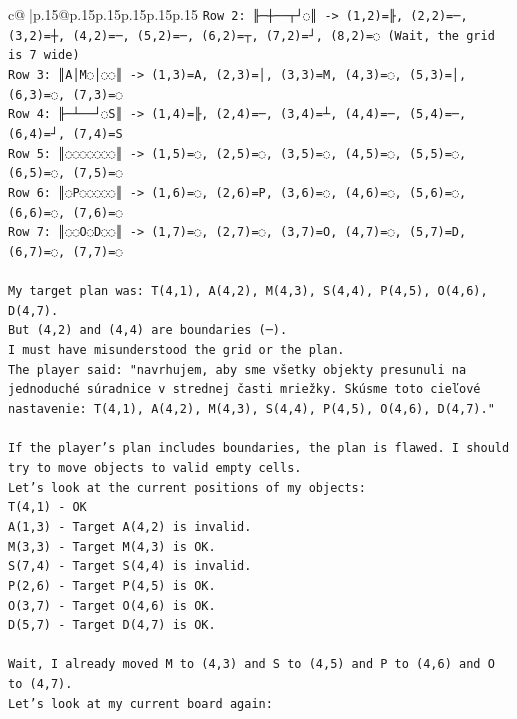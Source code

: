 \documentclass{article}
\begin{document}
{\begin{supertabular}{c@{$\;$}|p{.15\linewidth}@{}p{.15\linewidth}p{.15\linewidth}p{.15\linewidth}p{.15\linewidth}p{.15\linewidth}}
{{{\texttt{Row 2: ╟─┼──┬┘◌║ {-}> (1,2)=╟, (2,2)=─, (3,2)=┼, (4,2)=─, (5,2)=─, (6,2)=┬, (7,2)=┘, (8,2)=◌ (Wait, the grid is 7 wide)} \\
\texttt{Row 3: ║A│M◌│◌◌║ {-}> (1,3)=A, (2,3)=│, (3,3)=M, (4,3)=◌, (5,3)=│, (6,3)=◌, (7,3)=◌} \\
\texttt{Row 4: ╟─┴──┘◌S║ {-}> (1,4)=╟, (2,4)=─, (3,4)=┴, (4,4)=─, (5,4)=─, (6,4)=┘, (7,4)=S} \\
\texttt{Row 5: ║◌◌◌◌◌◌◌║ {-}> (1,5)=◌, (2,5)=◌, (3,5)=◌, (4,5)=◌, (5,5)=◌, (6,5)=◌, (7,5)=◌} \\
\texttt{Row 6: ║◌P◌◌◌◌◌║ {-}> (1,6)=◌, (2,6)=P, (3,6)=◌, (4,6)=◌, (5,6)=◌, (6,6)=◌, (7,6)=◌} \\
\texttt{Row 7: ║◌◌O◌D◌◌║ {-}> (1,7)=◌, (2,7)=◌, (3,7)=O, (4,7)=◌, (5,7)=D, (6,7)=◌, (7,7)=◌} \\
\\ 
\texttt{My target plan was: T(4,1), A(4,2), M(4,3), S(4,4), P(4,5), O(4,6), D(4,7).} \\
\texttt{But (4,2) and (4,4) are boundaries (─).} \\
\texttt{I must have misunderstood the grid or the plan.} \\
\texttt{The player said: "navrhujem, aby sme všetky objekty presunuli na jednoduché súradnice v strednej časti mriežky. Skúsme toto cieľové nastavenie: T(4,1), A(4,2), M(4,3), S(4,4), P(4,5), O(4,6), D(4,7)."} \\
\\ 
\texttt{If the player's plan includes boundaries, the plan is flawed. I should try to move objects to valid empty cells.} \\
\texttt{Let's look at the current positions of my objects:} \\
\texttt{T(4,1) {-} OK} \\
\texttt{A(1,3) {-} Target A(4,2) is invalid.} \\
\texttt{M(3,3) {-} Target M(4,3) is OK.} \\
\texttt{S(7,4) {-} Target S(4,4) is invalid.} \\
\texttt{P(2,6) {-} Target P(4,5) is OK.} \\
\texttt{O(3,7) {-} Target O(4,6) is OK.} \\
\texttt{D(5,7) {-} Target D(4,7) is OK.} \\
\\ 
\texttt{Wait, I already moved M to (4,3) and S to (4,5) and P to (4,6) and O to (4,7).} \\
\texttt{Let's look at my current board again:} \\
}}}
\end{supertabular}}
\end{document}
